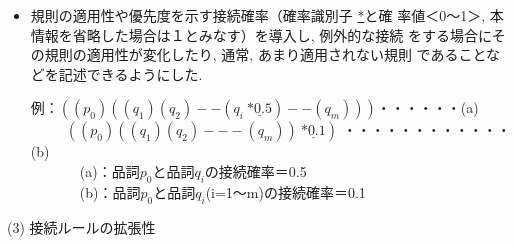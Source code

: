 \begin{itemize}
が\hspace*{-0.05mm}接\hspace*{-0.05mm}続\hspace*{-0.05mm}す\hspace*{-0.05mm}る\hspace*{-0.05mm}か\hspace*{-0.05mm}否\hspace*{-0.05mm}か\hspace*{-0.05mm}）\hspace*{-0.05mm}など例外的処理を行\\うため, 接続ルールからある種の手
続きの起動を指示するような情報（手続き識別子 \underline{\$}と手続き名）
を品詞\(q_{i}\)と共に接続ルール中に記述できるようにした. 
例：(\(q_{i}\)/\underline{\$uonbin})

\item 規則の適用性や優先度を示す接続確率（確率識別子 \underline{*}と確
率値＜0〜1＞, 本情報を省略した場合は１とみなす）を導入し, 例外的な接続
をする場合にその規則の適用性が変化したり, 通常, あまり適用されない規則
であることなどを記述できるようにした.

 例：\(((p_{0})((q_{1})(q_{2})--(q_{i}~\underline{*0.5})--(q_{m})))\)・\hspace{-.6em}・\hspace{-.6em}・\hspace{-.6em}・\hspace{-.6em}・\hspace{-.6em}・(a)\\
~~~~~\(((p_{0})((q_{1})(q_{2})---(q_{m}))~\underline{*0.1})\) ・\hspace{-.6em}・\hspace{-.6em}・\hspace{-.6em}・\hspace{-.6em}・\hspace{-.6em}・\hspace{-.6em}・\hspace{-.6em}・\hspace{-.6em}・\hspace{-.6em}・\hspace{-.6em}・\hspace{-.6em}・(b)\\
~~~~~~~(a)：品詞\(p_{0}\)と品詞\(q_{i}\)の接続確率＝0.5 \\
~~~~~~~(b)：品詞\(p_{0}\)と品詞\(q_{i}\)(i=1〜m)の接続確率＝0.1
\end{itemize}
(3) 接続ルールの拡張性
